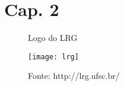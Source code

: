 \chapter{Cap. 2}

\lipsum

\begin{figure}[h]
\centering
\caption{Logo do LRG}
\texttt{[image: lrg]}
\caption*{Fonte: http://lrg.ufsc.br/}
\end{figure}

\lipsum[1]